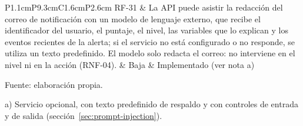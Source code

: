 \begin{tablacompacta}
\begin{longtable}{P{1.1cm}P{9.3cm}C{1.6cm}P{2.6cm}}
	\hline
	RF-31 & La API puede asistir la redacción del correo de notificación con un modelo de lenguaje externo, que recibe el identificador del usuario, el puntaje, el nivel, las variables que lo explican y los eventos recientes de la alerta; si el servicio no está configurado o no responde, se utiliza un texto predefinido. El modelo solo redacta el correo: no interviene en el nivel ni en la acción (RNF-04). & Baja & Implementado (ver nota a) \\
	\hline
\end{longtable}
{\small Fuente: elaboración propia.\par}
\end{tablacompacta}

\begin{notastabla}
\noindent a) Servicio opcional, con texto predefinido de respaldo y con controles de entrada y de salida (sección~\ref{sec:prompt-injection}).
\end{notastabla}

